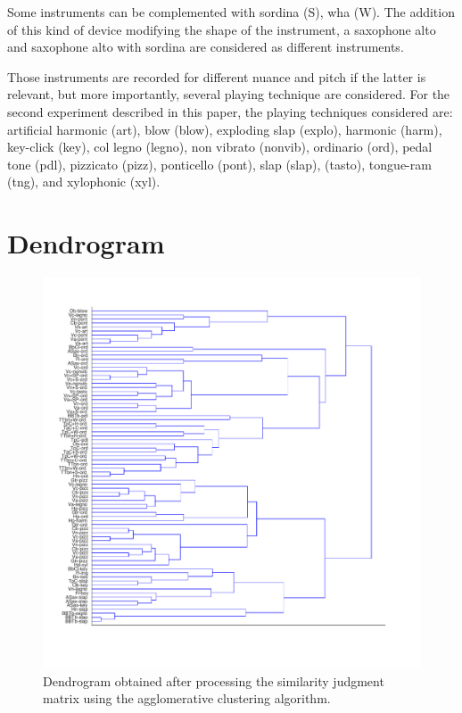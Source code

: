 \documentclass{article}
\begin{document}
Some instruments can be complemented with sordina (S), wha (W). The addition of this kind of device modifying the shape of the instrument, a saxophone alto and saxophone alto with sordina are considered as different instruments.

Those instruments are recorded for different nuance and pitch if the latter is relevant, but more importantly, several playing technique are considered. For  the second experiment described in this paper, the playing techniques considered are: artificial harmonic (art), blow (blow), exploding slap  (explo), harmonic (harm), key-click (key), col legno   (legno), non vibrato (nonvib), ordinario (ord), pedal tone (pdl), pizzicato (pizz), ponticello (pont), slap (slap), (tasto), tongue-ram (tng), and xylophonic (xyl).

\section{Dendrogram}


\begin{figure}
\center
\includegraphics[width = \textwidth]{figures/dendrogram.pdf}
\caption{Dendrogram obtained after processing the similarity judgment matrix using the agglomerative clustering algorithm.}
\label{fig:dendrogram}
\end{figure}
\end{document}
